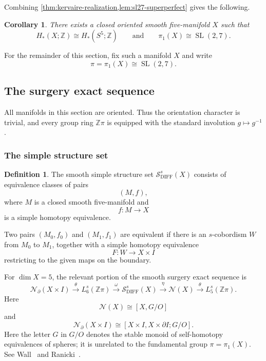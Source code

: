 \documentclass[10pt,reqno]{amsart}
\numberwithin{equation}{section}
\newtheorem{corollary}{Corollary}
\theoremstyle{definition}
\newtheorem{definition}{Definition}
\theoremstyle{remark}
\newcommand{\Z}{\mathbb Z}
\newcommand{\DIFF}{\mathrm{DIFF}}
\newcommand{\cS}{\mathcal S}
\newcommand{\cN}{\mathcal N}
\newcommand{\SL}{\operatorname{SL}}
\begin{document}
Combining \cref{thm:kervaire-realization,lem:sl27-superperfect}
gives the following.

\begin{corollary}\label{cor:existence-X}
There exists a closed oriented smooth five-manifold \(X\) such that
\[
H_*(X;\Z)\cong H_*(S^5;\Z)
\qquad\text{and}\qquad
\pi_1(X)\cong\SL(2,7).
\]
\end{corollary}

For the remainder of this section, fix such a manifold \(X\) and write
\[
\pi=\pi_1(X)\cong\SL(2,7).
\]

\subsection{The surgery exact sequence}

All manifolds in this section are oriented.  Thus the orientation
character is trivial, and every group ring \(\Z\pi\) is equipped with
the standard involution \(g\mapsto g^{-1}\).

\subsubsection{The simple structure set}

\begin{definition}
The smooth simple structure set \(\cS^s_{\DIFF}(X)\) consists of
equivalence classes of pairs
\[
(M,f),
\]
where \(M\) is a closed smooth five-manifold and
\[
f\colon M\longrightarrow X
\]
is a simple homotopy equivalence.

Two pairs \((M_0,f_0)\) and \((M_1,f_1)\) are equivalent if there is
an \(s\)-cobordism \(W\) from \(M_0\) to \(M_1\), together with a
simple homotopy equivalence
\[
F\colon W\longrightarrow X\times I
\]
restricting to the given maps on the boundary.
\end{definition}

For \(\dim X=5\), the relevant portion of the smooth surgery exact
sequence is
\begin{equation}\label{eq:surgery-sequence}
\cN_{\partial}(X\times I)
\xrightarrow{\theta}
L_6^s(\Z\pi)
\xrightarrow{\omega}
\cS^s_{\DIFF}(X)
\xrightarrow{\eta}
\cN(X)
\xrightarrow{\theta}
L_5^s(\Z\pi).
\end{equation}
Here
\[
\cN(X)\cong[X,G/O]
\]
and
\[
\cN_{\partial}(X\times I)
\cong
[X\times I,X\times\partial I;G/O].
\]
Here the letter \(G\) in \(G/O\) denotes the stable monoid of
self-homotopy equivalences of spheres; it is unrelated to the
fundamental group \(\pi=\pi_1(X)\).
See Wall~\cite{Wall} and Ranicki~\cite{RanickiAG}.
\end{document}

